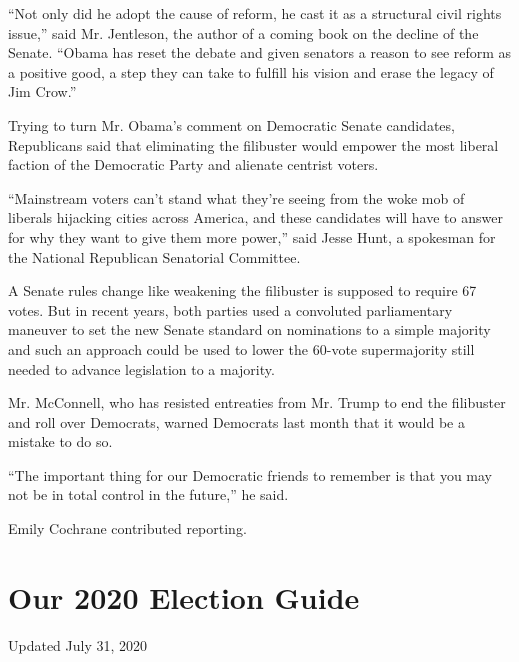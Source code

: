 ``Not only did he adopt the cause of reform, he cast it as a structural
civil rights issue,'' said Mr. Jentleson, the author of a coming book on
the decline of the Senate. ``Obama has reset the debate and given
senators a reason to see reform as a positive good, a step they can take
to fulfill his vision and erase the legacy of Jim Crow.''

Trying to turn Mr. Obama's comment on Democratic Senate candidates,
Republicans said that eliminating the filibuster would empower the most
liberal faction of the Democratic Party and alienate centrist voters.

``Mainstream voters can't stand what they're seeing from the woke mob of
liberals hijacking cities across America, and these candidates will have
to answer for why they want to give them more power,'' said Jesse Hunt,
a spokesman for the National Republican Senatorial Committee.

A Senate rules change like weakening the filibuster is supposed to
require 67 votes. But in recent years, both parties used a convoluted
parliamentary maneuver to set the new Senate standard on nominations to
a simple majority and such an approach could be used to lower the
60-vote supermajority still needed to advance legislation to a majority.

Mr. McConnell, who has resisted entreaties from Mr. Trump to end the
filibuster and roll over Democrats, warned Democrats last month that it
would be a mistake to do so.

``The important thing for our Democratic friends to remember is that you
may not be in total control in the future,'' he said.

Emily Cochrane contributed reporting.

\hypertarget{our-2020-election-guide}{%
\section{Our 2020 Election Guide}\label{our-2020-election-guide}}

Updated July 31, 2020

